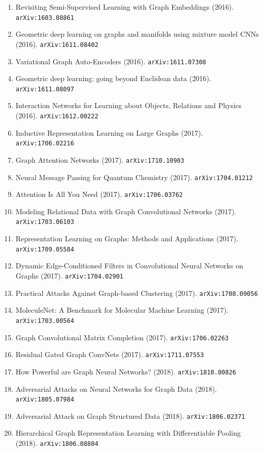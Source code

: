 \documentclass[11pt]{article}
\begin{document}
\begin{enumerate}
  \item Revisiting Semi-Supervised Learning with Graph Embeddings (2016). \texttt{arXiv:1603.08861}
  \item Geometric deep learning on graphs and manifolds using mixture model CNNs (2016). \texttt{arXiv:1611.08402}
  \item Variational Graph Auto-Encoders (2016). \texttt{arXiv:1611.07308}
  \item Geometric deep learning: going beyond Euclidean data (2016). \texttt{arXiv:1611.08097}
  \item Interaction Networks for Learning about Objects, Relations and Physics (2016). \texttt{arXiv:1612.00222}
  \item Inductive Representation Learning on Large Graphs (2017). \texttt{arXiv:1706.02216}
  \item Graph Attention Networks (2017). \texttt{arXiv:1710.10903}
  \item Neural Message Passing for Quantum Chemistry (2017). \texttt{arXiv:1704.01212}
  \item Attention Is All You Need (2017). \texttt{arXiv:1706.03762}
  \item Modeling Relational Data with Graph Convolutional Networks (2017). \texttt{arXiv:1703.06103}
  \item Representation Learning on Graphs: Methods and Applications (2017). \texttt{arXiv:1709.05584}
  \item Dynamic Edge-Conditioned Filters in Convolutional Neural Networks on
  Graphs (2017). \texttt{arXiv:1704.02901}
  \item Practical Attacks Against Graph-based Clustering (2017). \texttt{arXiv:1708.09056}
  \item MoleculeNet: A Benchmark for Molecular Machine Learning (2017). \texttt{arXiv:1703.00564}
  \item Graph Convolutional Matrix Completion (2017). \texttt{arXiv:1706.02263}
  \item Residual Gated Graph ConvNets (2017). \texttt{arXiv:1711.07553}
  \item How Powerful are Graph Neural Networks? (2018). \texttt{arXiv:1810.00826}
  \item Adversarial Attacks on Neural Networks for Graph Data (2018). \texttt{arXiv:1805.07984}
  \item Adversarial Attack on Graph Structured Data (2018). \texttt{arXiv:1806.02371}
  \item Hierarchical Graph Representation Learning with Differentiable Pooling (2018). \texttt{arXiv:1806.08804}

\end{enumerate}
\end{document}
